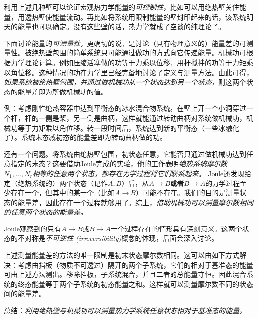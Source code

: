 利用上述几种壁可以论证宏观热力学能量的{\it 可控制性}，比如可以用绝热壁关住能量，用透热壁使能量流动。再比如将系统用限制能量的壁封印起来的话，该系统明天的能量也可以确定。没有这些壁的话，热力学就成了空谈的纯理论了。

下面讨论能量的{\it 可测量性}，更确切的说，是讨论（具有物理意义的）能量差的可测量性。被绝热壁包围的简单系统只可能通过做功的方式向它传递能量。机械功可根据力学理论计算。例如压缩活塞做的功等于力乘以位移，用杆搅拌的功等于力矩乘以角位移。这种情况的功在力学里已经完备地讨论了定义与测量方法。由此可得，{\it 如果系统被绝热壁包围，并通过做机械功从一个状态达到另一个状态，}则这两个状态的能量差即为所做机械功的值。 

例：考虑刚性绝热容器中达到平衡态的冰水混合物系统。在壁上开一个小洞穿过一个杆，杆的一侧是桨，另一侧是曲柄，这样就能通过转动曲柄对系统做机械功，机械功等于力矩乘以角位移。转一段时间后，系统达到新的平衡态（一些冰融化了）。系统末态减初态的能量差即为转动曲柄做的功。

还有一个问题。将系统由绝热壁包围，初状态任意，它能否只通过做机械功达到任意指定的末态？这要借助Joule完成的实验，他的工作表明{\it 绝热系统摩尔数$N_1, \dots, N_r$相等的任意两个状态，都存在力学过程将它们联系起来}。 Joule还发现给定（绝热系统的）两个状态（记作$A, B$）后，从$A \to B${\bf 或者}$B \to A$的力学过程至少存在一个，但其中的某一个（比如$A \to B$）可能不存在。我们的目的是测量状态的能量差，因此存在一个过程就够用了。综上，{\it 借助机械功可以测量摩尔数相同的任意两个状态的能量差。}

Joule观察到的只有$A \to B$或$B \to A$一个过程存在的情形具有深刻意义。这两个状态的不对称是{\it 不可逆性 (irreversibility)}概念的体现，后面会深入讨论。

上述测量能量差的方法的唯一限制是初末状态摩尔数相同。这可以由如下方式解决：考虑由挡板（物质不可透过）隔开的两个子系统，它们的相对于基准态的能量可由上述方法测出。移除挡板，子系统混合，并且二者的总能量守恒。因此混合系统的终态能量等于两个子系统的初态能量之和。这样就可以测量摩尔数不同的状态间的能量差。

总结：{\it 利用绝热壁与机械功可以测量热力学系统任意状态相对于基准态的能量。}

